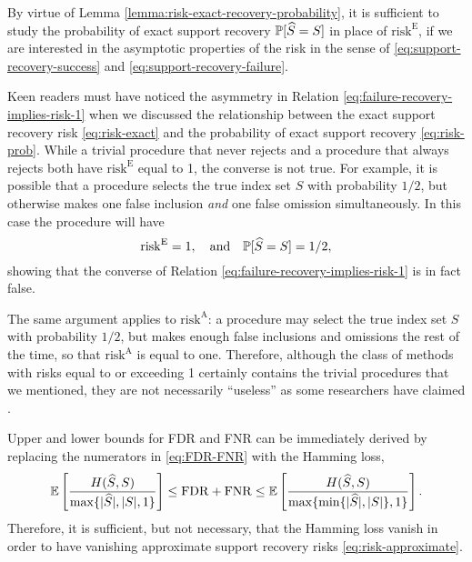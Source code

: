 By virtue of Lemma \ref{lemma:risk-exact-recovery-probability}, it is sufficient to study the probability of exact support recovery $\P[\widehat{S}=S]$ in place of $\mathrm{risk}^{\mathrm{E}}$, if we are interested in the asymptotic properties of the risk in the sense of \eqref{eq:support-recovery-success} and \eqref{eq:support-recovery-failure}.

\medskip

Keen readers must have noticed the asymmetry in Relation \eqref{eq:failure-recovery-implies-risk-1} when we discussed the relationship between the exact support recovery risk \eqref{eq:risk-exact} and the probability of exact support recovery \eqref{eq:risk-prob}.
%
While a trivial procedure that never rejects and a procedure that always rejects both have $\mathrm{risk}^{\mathrm{E}}$ equal to 1, the converse is not true. For example, it is possible that a procedure selects the true index set $S$ with probability $1/2$, but otherwise makes one false inclusion \emph{and} one false omission simultaneously. 
In this case the procedure will have 
$$\mathrm{risk}^{\mathrm{E}} = 1, \quad \text{and} \quad \P[\widehat{S}=S] = 1/2,$$
showing that the converse of Relation \eqref{eq:failure-recovery-implies-risk-1} is in fact false.

The same argument applies to $\mathrm{risk}^{\mathrm{A}}$:
a procedure may select the true index set $S$ with probability $1/2$, but makes enough false inclusions and omissions 
the rest of the time, so that $\mathrm{risk}^{\mathrm{A}}$ is equal to one. Therefore, although the class of methods with 
risks equal to or exceeding 1 certainly contains the trivial procedures that we mentioned, they are not necessarily 
``useless'' as some researchers have claimed \citep[cf.\ Remark 2 in][]{arias2017distribution}.

\medskip

Upper and lower bounds for \ac{FDR} and \ac{FNR} can be immediately derived by replacing the numerators in \eqref{eq:FDR-FNR} with the Hamming loss,
\begin{equation} \label{eq:Hamming-loss-FDR-FNR-bound}
    \E\left[\frac{H(\widehat{S}, S)}{\max\{|\widehat{S}|, |S|, 1\}}\right] 
    \le \mathrm{FDR} + \mathrm{FNR}
    \le \E\left[\frac{H(\widehat{S}, S)}{\max\{\min\{|\widehat{S}|, |S|\}, 1\}}\right].
\end{equation}
Therefore, it is sufficient, but not necessary, that the Hamming loss vanish in order to have vanishing approximate support recovery risks \eqref{eq:risk-approximate}.

